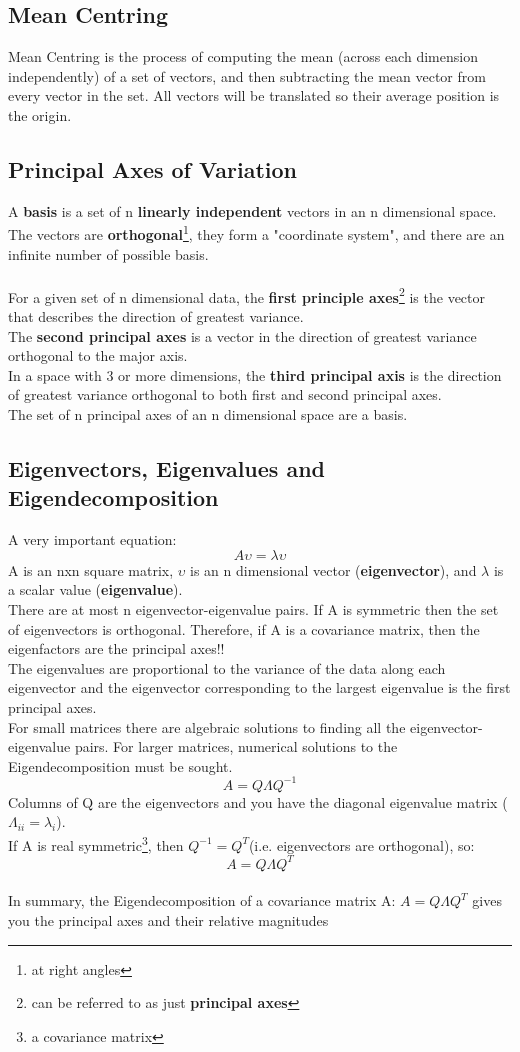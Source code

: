 \documentclass{article}
\begin{document}
	\subsection{Mean Centring}
	Mean Centring is the process of computing the mean (across each dimension independently) of a set of vectors, and then subtracting the mean vector from every vector in the set. All vectors will be translated so their average position is the origin.
	\subsection{Principal Axes of Variation}
	A \textbf{basis} is a set of n \textbf{linearly independent} vectors in an n dimensional space. The vectors are \textbf{orthogonal}\footnote{at right angles}, they form a "coordinate system", and there are an infinite number of possible basis.\\
	\\
	For a given set of n dimensional data, the \textbf{first principle axes}\footnote{can be referred to as just \textbf{principal axes}} is the vector that describes the direction of greatest variance.\\
	The \textbf{second principal axes}  is a vector in the direction of greatest variance orthogonal to the major axis.\\
	In a space with 3 or more dimensions, the \textbf{third principal axis} is the direction of greatest variance orthogonal to both first and second principal axes.\\
	The set of n principal axes of an n dimensional space are a basis.
	\subsection{Eigenvectors, Eigenvalues and Eigendecomposition}
	A very important equation:
	$$A\upsilon=\lambda\upsilon$$ 
	A is an nxn square matrix, $\upsilon$ is an n dimensional vector (\textbf{eigenvector}), and $\lambda$ is a scalar value (\textbf{eigenvalue}).\\
	There are at most n eigenvector-eigenvalue pairs. If A is symmetric then the set of eigenvectors is orthogonal. Therefore, if A is a covariance matrix, then the eigenfactors are the principal axes!!\\
	The eigenvalues are proportional to the variance of the data along each eigenvector and the eigenvector corresponding to the largest eigenvalue is the first principal axes.\\
	For small matrices there are algebraic solutions to finding all the eigenvector-eigenvalue pairs. For larger matrices, numerical solutions to the Eigendecomposition must be sought.\\
	$$A=Q\Lambda Q^{-1}$$
	Columns of Q are the eigenvectors and you have the diagonal eigenvalue matrix ($\Lambda_{ii}=\lambda_i$).\\
	If A is real symmetric\footnote{a covariance matrix}, then $Q^{-1}=Q^T$(i.e. eigenvectors are orthogonal), so:
	$$A=Q\Lambda Q^T$$\\
	In summary, the Eigendecomposition of a covariance matrix A: $A=Q\Lambda Q^T$ gives you the principal axes and their relative magnitudes
\end{document}
